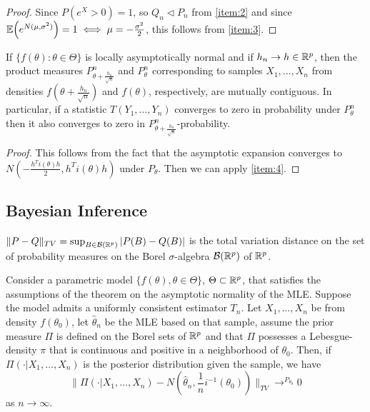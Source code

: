 \begin{proof}
  Since $P(e^{X} > 0) = 1$, so $Q_{n} \triangleleft P_{n}$ from
  \ref{item:2} and since $\E{e^{N(\mu, \sigma^{2})}} = 1 \iff \mu = -
  \frac{\sigma^{2}}{2}$, this follows from \ref{item:3}.
\end{proof}

\begin{thm}
  If $\{ f(\theta): \theta \in \Theta \}$ is locally asymptotically
  normal and if $h_{n} \rightarrow h \in \mathbb{R}^{p}$, then the product
  measures $P^{n}_{\theta + \frac{h_{n}}{\sqrt{n}} }$ and
  $P^{n}_{\theta}$ corresponding to samples $X_{1}, \dots, X_{n}$ from
  densities $f(\theta + \frac{h_{n}}{\sqrt{n}})$ and $f(\theta)$,
  respectively, are mutually contiguous. In particular, if a statistic
  $T(Y_{1}, \dots, Y_{n})$ converges to zero in probability under
  $P^{n}_{\theta}$ then it also converges to zero in $P^{n}_{\theta +
    \frac{h_{n}}{\sqrt{n}} }$-probability.
\end{thm}

\begin{proof}
  This follows from the fact that the asymptotic expansion converges
  to $N(-\frac{h^{T} i(\theta) h}{2}, h^{T} i(\theta) h)$ under
  $P_{\theta}$.  Then we can apply \ref{item:4}.
\end{proof}

\subsection{Bayesian Inference}
\label{sec:bayesian-inference}

\begin{defn}
  \label{sec:beginenumerate-}
  $\| P - Q \|_{TV} = \sup_{B \in \mathcal{B}(\mathbb{R}^{p})} |P(B) - Q(B)|$
  is the total variation distance on the set of probability measures
  on the Borel $\sigma$-algebra $\mathcal{B}(\mathbb{R}^{p})$ of $\mathbb{R}^{p}$.
\end{defn}

\begin{thm}
  Consider a parametric model $\{ f(\theta), \theta \in \Theta \} $,
  $\Theta \subset \mathbb{R}^{p}$, that satisfies the assumptions of the
  theorem on the asymptotic normality of the MLE.  Suppose the model
  admits a uniformly consistent estimator $T_{n}$.  Let $X_{1}, \dots,
  X_{n}$ be \iid from density $f(\theta_{0})$, let $\hat \theta_{n}$
  be the MLE based on that sample, assume the prior measure $\Pi$ is
  defined on the Borel sets of $\mathbb{R}^{p}$ and that $\Pi$ possesses a
  Lebesgue-density $\pi$ that is continuous and positive in a
  neighborhood of $\theta_{0}$. Then, if $\Pi(\cdot | X_{1}, \dots,
  X_{n})$ is the posterior distribution given the sample, we have
  \begin{equation}
    \label{eq:29}
    \| \Pi(\cdot | X_{1}, \dots, X_{n}) - N(\hat \theta_{n},
    \frac{1}{n} i^{-1}(\theta_{0})) \|_{TV}
    \rightarrow^{P_{\theta_{0}}} 0
  \end{equation} as $n \rightarrow \infty$.
\end{thm}


